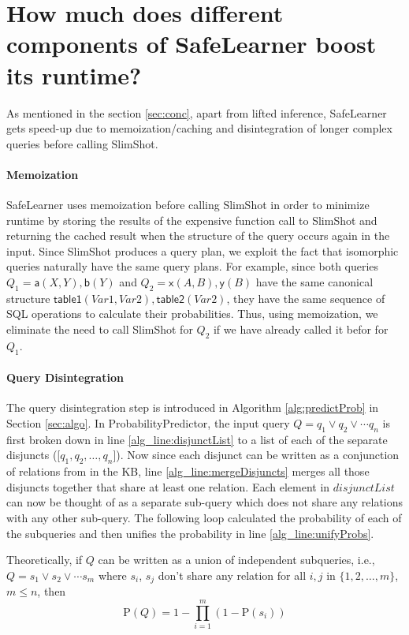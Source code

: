\documentclass[akbc,twoside,11pt]{article}
\newcounter{example}
\newcommand{\algorithmname}{SafeLearner\xspace}
\begin{document}
\section{How much does different components of \algorithmname boost its runtime?}\label{appendix:4}

As mentioned in the section \ref{sec:conc}, apart from lifted inference, \algorithmname gets speed-up due to memoization/caching and disintegration of longer complex queries before calling SlimShot.

\paragraph{Memoization}
\algorithmname uses memoization before calling SlimShot in order to minimize runtime by storing the results of the expensive function call to SlimShot and returning the cached result when the structure of the query occurs again in the input. Since SlimShot produces a query plan, we exploit the fact that isomorphic queries naturally have the same query plans. For example, since both queries $Q_1 = \mathsf{a}(X,Y),\mathsf{b}(Y)$ and $Q_2 = \mathsf{x}(A,B), \mathsf{y}(B)$ have the same canonical structure $\mathsf{table1}(Var1, Var2), \mathsf{table2}(Var2)$, they have the same sequence of SQL operations to calculate their probabilities. Thus, using memoization, we eliminate the need to call SlimShot for $Q_2$ if we have already called it befor for $Q_1$. 

\paragraph{Query Disintegration} 
The query disintegration step is introduced in Algorithm \ref{alg:predictProb} in Section \ref{sec:algo}. In ProbabilityPredictor, the input query $Q = q_1 \vee q_2 \vee \cdots q_n$ is first broken down in line \ref{alg_line:disjunctList} to a list of each of the separate disjuncts ([$q_1, q_2, \ldots , q_n$]). Now since each disjunct can be written as a conjunction of relations from in the KB, line \ref{alg_line:mergeDisjuncts} merges all those disjuncts together that share at least one relation. Each element in $disjunctList$ can now be thought of as a separate sub-query which does not share any relations with any other sub-query. The following loop calculated the probability of each of the subqueries and then unifies the probability in line \ref{alg_line:unifyProbs}.

Theoretically, if $Q$ can be written as a union of independent subqueries, i.e., 
$Q = s_1 \vee s_2 \vee \cdots s_m$ where $s_i$, $s_j$ don't share any relation for all $i, j$ in $\{1, 2, \ldots, m\}$, $m \leq n$, then\\
\begin{equation}
    \mathrm{P}(Q) = 1 - \prod_{i = 1}^m(1 - \mathrm{P}(s_i))
\end{equation}
\end{document}
